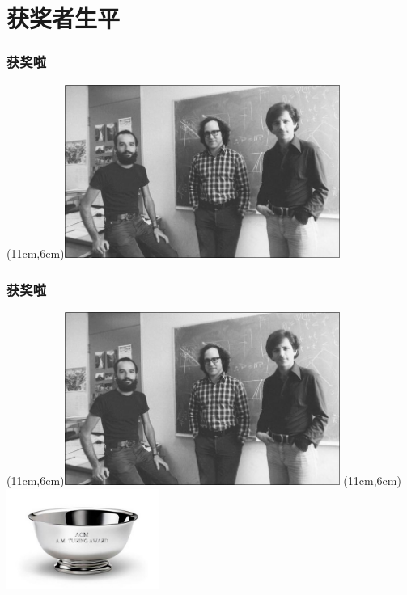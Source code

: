 \documentclass[slidestop,compress,mathserif]{beamer}
\begin{document}
\section{获奖者生平}

\begin{frame}
  \transwipe
  \frametitle{获奖啦}
  \parpic(11cm,6cm){\includegraphics[width=9cm]{3peoples}}

\end{frame}

\begin{frame}
  \transboxout
  \frametitle{获奖啦}
  \parpic(11cm,6cm){\includegraphics[width=9cm]{3peoples}}
  \parpic(11cm,6cm){\includegraphics[width=5cm]{turing}}


\end{frame}
\end{document}
